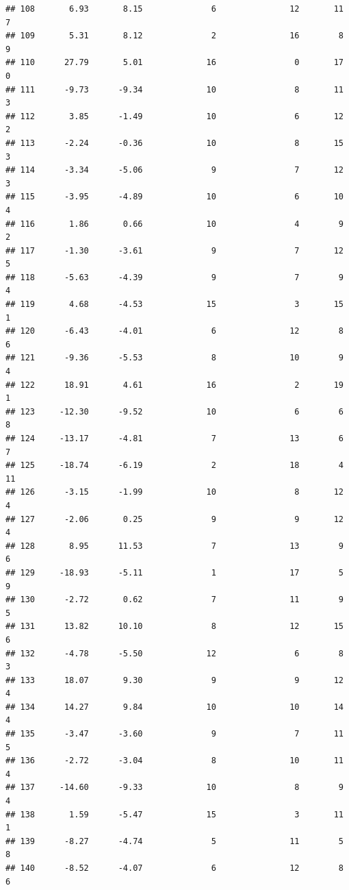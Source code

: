 \documentclass[]{book}
\begin{document}
\begin{verbatim}
## 108       6.93       8.15              6               12       11          7
## 109       5.31       8.12              2               16        8          9
## 110      27.79       5.01             16                0       17          0
## 111      -9.73      -9.34             10                8       11          3
## 112       3.85      -1.49             10                6       12          2
## 113      -2.24      -0.36             10                8       15          3
## 114      -3.34      -5.06              9                7       12          3
## 115      -3.95      -4.89             10                6       10          4
## 116       1.86       0.66             10                4        9          2
## 117      -1.30      -3.61              9                7       12          5
## 118      -5.63      -4.39              9                7        9          4
## 119       4.68      -4.53             15                3       15          1
## 120      -6.43      -4.01              6               12        8          6
## 121      -9.36      -5.53              8               10        9          4
## 122      18.91       4.61             16                2       19          1
## 123     -12.30      -9.52             10                6        6          8
## 124     -13.17      -4.81              7               13        6          7
## 125     -18.74      -6.19              2               18        4         11
## 126      -3.15      -1.99             10                8       12          4
## 127      -2.06       0.25              9                9       12          4
## 128       8.95      11.53              7               13        9          6
## 129     -18.93      -5.11              1               17        5          9
## 130      -2.72       0.62              7               11        9          5
## 131      13.82      10.10              8               12       15          6
## 132      -4.78      -5.50             12                6        8          3
## 133      18.07       9.30              9                9       12          4
## 134      14.27       9.84             10               10       14          4
## 135      -3.47      -3.60              9                7       11          5
## 136      -2.72      -3.04              8               10       11          4
## 137     -14.60      -9.33             10                8        9          4
## 138       1.59      -5.47             15                3       11          1
## 139      -8.27      -4.74              5               11        5          8
## 140      -8.52      -4.07              6               12        8          6

\end{verbatim}
\end{document}
